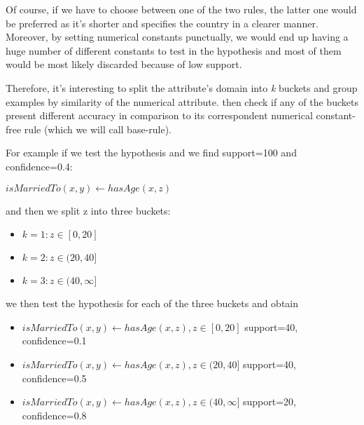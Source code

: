 Of course, if we have to choose between one of the two rules, the latter one would be preferred as it's shorter and specifies the country in a clearer manner. Moreover, by setting numerical constants punctually, we would end up having a huge number of different constants to test in the hypothesis and most of them would be most likely discarded because of low support.

Therefore, it's interesting to split the attribute's domain into \emph{k} buckets and group examples by similarity of the numerical attribute.
then check if any of the buckets present different accuracy in comparison to its correspondent numerical constant-free rule (which we will call base-rule).

For example if we test the hypothesis and we find support=100 and confidence=0.4:

\begin{center}
 \begin{math}isMarriedTo(x,y) \leftarrow hasAge(x,z)\end{math} 
\end{center}

and then we split z into three buckets:

\begin{itemize}
 \item \begin{math} k=1: z\in[0,20]\end{math}
 \item \begin{math} k=2: z\in(20,40]\end{math}
 \item \begin{math} k=3: z\in(40,\infty]\end{math}
\end{itemize}

we then test the hypothesis for each of the three buckets and obtain

\begin{itemize}

 \item \begin{math}isMarriedTo(x,y) \leftarrow hasAge(x,z), z\in[0,20]\end{math}	
    \newline support=40, confidence=0.1
 \item \begin{math}isMarriedTo(x,y) \leftarrow hasAge(x,z), z\in(20,40]\end{math}	
    \newline support=40, confidence=0.5
 \item \begin{math}isMarriedTo(x,y) \leftarrow hasAge(x,z), z\in(40,\infty]\end{math}
    \newline support=20, confidence=0.8

\end{itemize}

